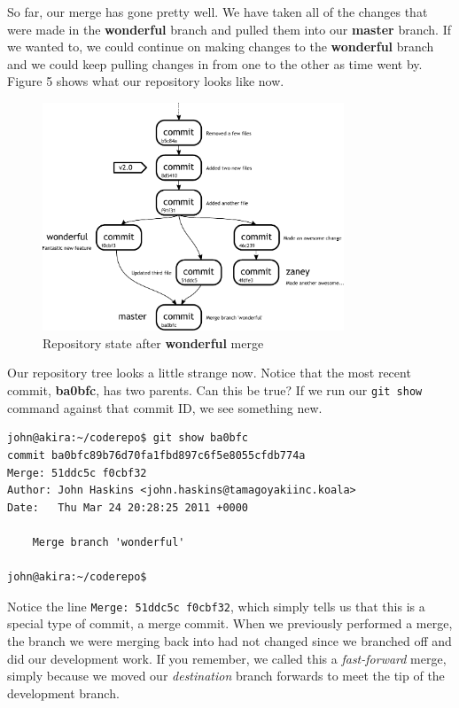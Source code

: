 So far, our merge has gone pretty well.  We have taken all of the changes that were made in the \textbf{wonderful} branch and pulled them into our \textbf{master} branch.  If we wanted to, we could continue on making changes to the \textbf{wonderful} branch and we could keep pulling changes in from one to the other as time went by.  Figure 5 shows what our repository looks like now.

\begin{figure}[hbt]
\centering
\includegraphics[width=9cm]{images/f-w4-d5.pdf}
\caption{Repository state after \textbf{wonderful} merge}
\end{figure}

Our repository tree looks a little strange now.  Notice that the most recent commit, \textbf{ba0bfc}, has two parents.  Can this be true?  If we run our \texttt{git show} command against that commit ID, we see something new.

\begin{Verbatim}[frame=leftline,framerule=1mm,fontsize=\relsize{-3}] 
john@akira:~/coderepo$ git show ba0bfc
commit ba0bfc89b76d70fa1fbd897c6f5e8055cfdb774a
Merge: 51ddc5c f0cbf32
Author: John Haskins <john.haskins@tamagoyakiinc.koala>
Date:   Thu Mar 24 20:28:25 2011 +0000

    Merge branch 'wonderful'

john@akira:~/coderepo$ 
\end{Verbatim}

Notice the line \texttt{Merge: 51ddc5c f0cbf32}, which simply tells us that this is a special type of commit, a merge commit.  When we previously performed a merge, the branch we were merging back into had not changed since we branched off and did our development work.  If you remember, we called this a \emph{fast-forward} merge, simply because we moved our \emph{destination} branch forwards to meet the tip of the development branch.

